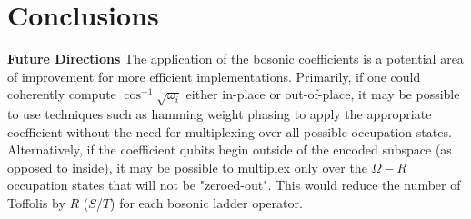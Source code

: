 \section{Conclusions}
\label{sec:conclusions}

\textbf{Future Directions}
The application of the bosonic coefficients is a potential area of improvement for more efficient implementations.
Primarily, if one could coherently compute $\cos^{-1}{\sqrt{\omega_i}}$ either in-place or out-of-place, it may be possible to use techniques such as hamming weight phasing to apply the appropriate coefficient without the need for multiplexing over all possible occupation states.
Alternatively, if the coefficient qubits begin outside of the encoded subspace (as opposed to inside), it may be possible to multiplex only over the $\Omega - R$ occupation states that will not be "zeroed-out". 
This would reduce the number of Toffolis by $R$ ($S$/$T$) for each bosonic ladder operator.
